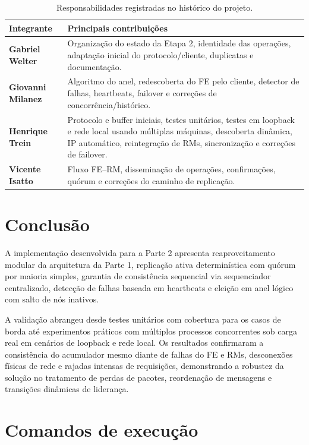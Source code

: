 \documentclass[12pt,a4paper]{article}
\begin{document}
\begin{table}[H]
    \centering
    \caption{Responsabilidades registradas no histórico do projeto.}
    \label{tab:responsabilidades}
    \begin{tabularx}{\textwidth}{>{\bfseries}l X}
        \toprule
        Integrante & Principais contribuições \\
        \midrule
        Gabriel Welter & Organização do estado da Etapa 2, identidade das operações, adaptação inicial do protocolo/cliente, duplicatas e documentação. \\
        Giovanni Milanez & Algoritmo do anel, redescoberta do FE pelo cliente, detector de falhas, heartbeats, failover e correções de concorrência/histórico. \\
        Henrique Trein & Protocolo e buffer iniciais, testes unitários, testes em loopback e rede local usando múltiplas máquinas, descoberta dinâmica, IP automático, reintegração de RMs, sincronização e correções de failover. \\
        Vicente Isatto & Fluxo FE--RM, disseminação de operações, confirmações, quórum e correções do caminho de replicação. \\
        \bottomrule
    \end{tabularx}
\end{table}

\section{Conclusão}

A implementação desenvolvida para a Parte 2 apresenta reaproveitamento modular da arquitetura da Parte 1, replicação ativa determinística com quórum por maioria simples, garantia de consistência sequencial via sequenciador centralizado, detecção de falhas baseada em heartbeats e eleição em anel lógico com salto de nós inativos.

A validação abrangeu desde testes unitários com cobertura para os casos de borda até experimentos práticos com múltiplos processos concorrentes sob carga real em cenários de loopback e rede local. Os resultados confirmaram a consistência do acumulador mesmo diante de falhas do FE e RMs, desconexões físicas de rede e rajadas intensas de requisições, demonstrando a robustez da solução no tratamento de perdas de pacotes, reordenação de mensagens e transições dinâmicas de liderança.

\appendix

\section{Comandos de execução}
\end{document}
